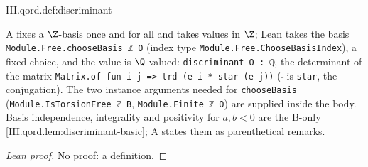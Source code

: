 \begin{definition}[discriminant]
\end{definition}
\begin{tfformal}{III.qord.def:discriminant}
\begin{tffidelity}
A fixes a $\Z$-basis once and for all and takes values in $\Z$; Lean takes the basis \texttt{Module.Free.chooseBasis ℤ O} (index type \texttt{Module.Free.ChooseBasisIndex}), a fixed choice, and the value is $\Q$-valued: \texttt{discriminant O : ℚ}, the determinant of the matrix \texttt{Matrix.of fun i j => trd (e i * star (e j))} ($\bar{\ }$ is \texttt{star}, the conjugation). The two instance arguments needed for \texttt{chooseBasis} (\texttt{Module.IsTorsionFree ℤ B}, \texttt{Module.Finite ℤ O}) are supplied inside the body. Basis independence, integrality and positivity for $a,b<0$ are the B-only \cref{III.qord.lem:discriminant-basic}; A states them as parenthetical remarks.
\end{tffidelity}
\end{tfformal}
\begin{proof}[Lean proof]
No proof: a definition.
\end{proof}

